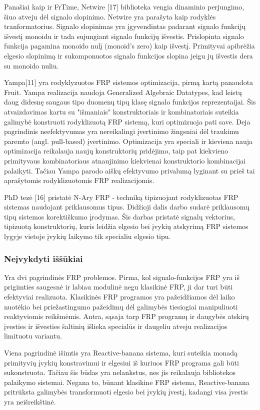 Panašiai kaip ir FrTime, Netwire [17] biblioteka vengia dinaminio perjungimo, šiuo atveju dėl signalo slopinimo. Netwire yra parašyta kaip rodyklės tranformatorius. Signalo slopinimas yra įgyvendintas padarant signalo funkcijų išvestį monoidu ir tada sujungiant signalo funkcijų išvestis. Prislopinta signalo funkcija pagamina monoido nulį (monoid's zero) kaip išvestį. Primityvai apibrėžia elgesio slopinimą ir sukomponuotos signalo funkcijos slopina jeigu jų išvestis dera su monoido nuliu.

Yampa[11] yra rodyklyzuotos FRP sistemos optimizacija, pirmą kartą panaudota Fruit. Yampa realizacija naudoja Generalized Algebraic Datatypes, kad leistų daug didesnę saugaus tipo duomenų tipų klasę signalo funkcijos reprezentaijai. Šis atvaizdavimas kartu su "išmaniais" konstruktoriais ir kombinatoriais suteikia galimybė konstruoti rodyklizuotą FRP sistemą, kuri optimizuoja pati save. Deja pagrindinis neefektyvumas yra nereikalingi įvertinimo žingsniai dėl traukimu paremto (angl. pull-based) įvertinimo. Optimizacija yra speciali ir kieviena nauja optimizacija reikalauja naujų konstruktorių pridėjimo, taip pat kiekvieno primityvaus kombinatoriaus atnaujinimo kiekvienai konstruktorio kombinacijai palaikyti. Tačiau Yampa parodo aiškų efektyvumo privalumą lyginant su prieš tai aprašytomis rodyklizuotomis FRP realizacijomis.

PhD tezė [16] pristatė N-Ary FRP - techniką tipizuojant rodyklizuotas FRP sistemas naudojant priklausomus tipus. Didžioji dalis darbo sudarė priklausomų tipų sistemos korektiškumo įrodymas. Šis darbas pristatė signalų vektorius, tipizuotą konstruktorių, kuris leidžia elgesio bei įvykių atskyrimą FRP sistemos lygyje vietoje įvykių laikymo tik specialiu elgesio tipu.

\subsubsection{Neįvykdyti iššūkiai}

Yra dvi pagrindinės FRP problemos. Pirma, kol signalo-funkcijos FRP yra iš prigimties saugesnė ir labiau modulinė negu klasikinė FRP, ji dar turi būti efektyviai realizuota. Klasikinės FRP programos yra pažeidžiamos dėl laiko nuotėkio bei priežastingumo pažeidimų dėl galimybės tiesiogiai manipuliuoti reaktyviomis reikšmėmis. Antra, sąsaja tarp FRP programų ir daugybės atskirų įvesties ir išvesties šaltinių išlieka specialūs ir daugeliu atveju realizacijos limituotu variantu.

Viena pagrindinė išimtis yra Reactive-banana sistema, kuri suteikia monadą primityvių įvykių konstravimui ir elgesiui iš kuriuos FRP programa gali būti sukonstruota. Tačiau šis būdas yra nelankstus, nes jis reikalauja bibliotekos palaikymo sistemai. Negana to, būnant klasikine FRP sistema, Reactive-banana pritrūksta galimybės transformuoti elgesio bei įvykių įvestį, kadangi visa įvestis yra neišreikštinė.





